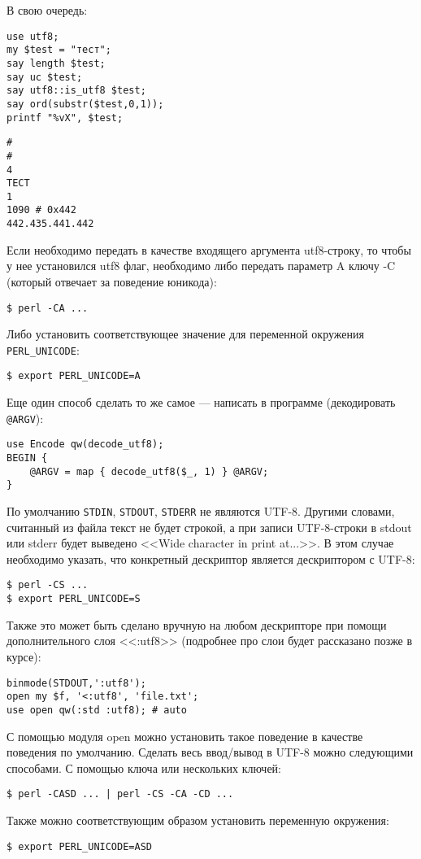 В свою очередь:
\begin{verbatim}
use utf8;
my $test = "тест";
say length $test;
say uc $test;
say utf8::is_utf8 $test;
say ord(substr($test,0,1));
printf "%vX", $test;
\end{verbatim}
\begin{verbatim}
#
#
4
ТЕСТ
1
1090 # 0x442
442.435.441.442
\end{verbatim}

Если необходимо передать в качестве входящего аргумента utf8-строку, то чтобы у нее установился utf8 флаг, необходимо либо передать параметр A ключу -C (который отвечает за поведение юникода):
\begin{verbatim}
$ perl -CA ...
\end{verbatim}
Либо установить соответствующее значение для переменной окружения \verb|PERL_UNICODE|:
\begin{verbatim}
$ export PERL_UNICODE=A
\end{verbatim}
Еще один способ сделать то же самое --- написать в программе (декодировать \verb|@ARGV|):
\begin{verbatim}
use Encode qw(decode_utf8);
BEGIN {
    @ARGV = map { decode_utf8($_, 1) } @ARGV;
}
\end{verbatim}
По умолчанию \verb|STDIN|, \verb|STDOUT|, \verb|STDERR| не являются UTF-8. Другими словами, считанный из файла текст не будет строкой, а при записи UTF-8-строки в stdout или stderr будет выведено <<Wide character in print at...>>. В этом случае необходимо указать, что конкретный дескриптор является дескриптором с UTF-8:
\begin{verbatim}
$ perl -CS ...
$ export PERL_UNICODE=S
\end{verbatim}
Также это может быть сделано вручную на любом дескрипторе при помощи дополнительного слоя <<:utf8>> (подробнее про слои будет рассказано позже в курсе):
\begin{verbatim}
binmode(STDOUT,':utf8');
open my $f, '<:utf8', 'file.txt';
use open qw(:std :utf8); # auto
\end{verbatim}
С помощью модуля open можно установить такое поведение в качестве поведения по умолчанию. Сделать весь ввод/вывод в UTF-8 можно следующими способами. С помощью ключа или нескольких ключей:
\begin{verbatim}
$ perl -CASD ... | perl -CS -CA -CD ...
\end{verbatim}
Также можно соответствующим образом установить переменную окружения:
\begin{verbatim}
$ export PERL_UNICODE=ASD
\end{verbatim}
